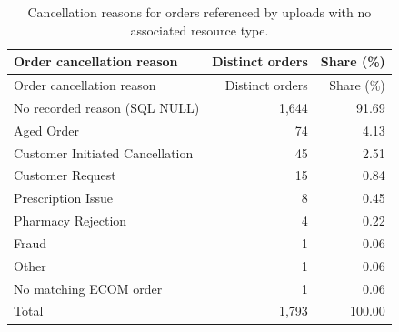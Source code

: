 \begin{longtable}{@{}lrr@{}}
\caption{Cancellation reasons for orders referenced by uploads with no associated resource type.}
\label{tab:null-resource-upload-order-cancel-reasons}\\
\toprule
Order cancellation reason & Distinct orders & Share (\%) \\
\midrule
\endfirsthead
\toprule
Order cancellation reason & Distinct orders & Share (\%) \\
\midrule
\endhead

{No recorded reason (SQL NULL)} & 1,644 & 91.69 \\

{Aged Order} & 74 & 4.13 \\

{Customer Initiated Cancellation} & 45 & 2.51 \\

{Customer Request} & 15 & 0.84 \\

{Prescription Issue} & 8 & 0.45 \\

{Pharmacy Rejection} & 4 & 0.22 \\

{Fraud} & 1 & 0.06 \\

{Other} & 1 & 0.06 \\

{No matching ECOM order} & 1 & 0.06 \\
\midrule
Total & 1,793 & 100.00 \\
\bottomrule
\end{longtable}